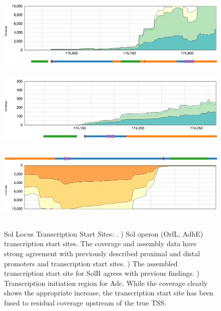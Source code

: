 \begin{figure}
\small
{\includegraphics[width=\textwidth,height=1.5in]{images/Assembly/Sol/Sol-TSS.png}
\label{fig:2a}}
{\includegraphics[width=\textwidth,height=1.5in]{images/Assembly/Sol/Sol-SolR-TSS.png}
\label{fig:2b}}
{\includegraphics[width=\textwidth,height=1.5in]{images/Assembly/Sol/Sol-Adc-TSS.png}
\label{fig:2c}}
\caption{Sol Locus Transcription Start Sites: . ) Sol operon (OrfL, AdhE) transcription start sites. The coverage and assembly data have strong agreement with previously described proximal and distal promoters and transcription start sites. ) The assembled transcription start site for SolR agrees with previous findings. ) Transcription initiation region for Adc. While the coverage clearly shows the appropriate increase, the transcription start site has been fused to residual coverage upstream of the true TSS. }
\end{figure}
